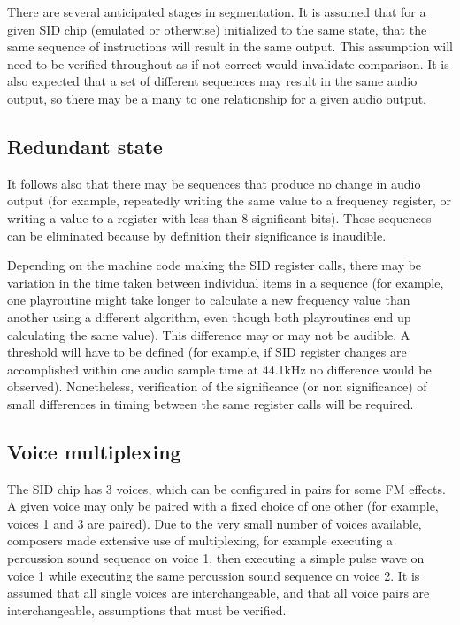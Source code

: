 \documentclass[10pt]{article}
\begin{document}
\begin{multicols*}{2}
There are several anticipated stages in segmentation. It is assumed that for a given SID chip (emulated or otherwise) initialized to the same state, that the same sequence of instructions will result in the same output. This assumption will need to be verified throughout as if not correct would invalidate comparison. It is also expected that a set of different sequences may result in the same audio output, so there may be a many to one relationship for a given audio output.

\subsection{Redundant state}

It follows also that there may be sequences that produce no change in audio output (for example, repeatedly writing the same value to a frequency register, or writing a value to a register with less than 8 significant bits). These sequences can be eliminated because by definition their significance is inaudible.

Depending on the machine code making the SID register calls, there may be variation in the time taken between individual items in a sequence (for example, one playroutine might take longer to calculate a new frequency value than another using a different algorithm, even though both playroutines end up calculating the same value). This difference may or may not be audible. A threshold will have to be defined (for example, if SID register changes are accomplished within one audio sample time at 44.1kHz no difference would be observed). Nonetheless, verification of the significance (or non significance) of small differences in timing between the same register calls will be required.

\subsection{Voice multiplexing}

The SID chip has 3 voices, which can be configured in pairs for some FM effects. A given voice may only be paired with a fixed choice of one other (for example, voices 1 and 3 are paired). Due to the very small number of voices available, composers made extensive use of multiplexing, for example executing a percussion sound sequence on voice 1, then executing a simple pulse wave on voice 1 while executing the same percussion sound sequence on voice 2. It is assumed that all single voices are interchangeable, and that all voice pairs are interchangeable, assumptions that must be verified.


\end{multicols*}
\end{document}
